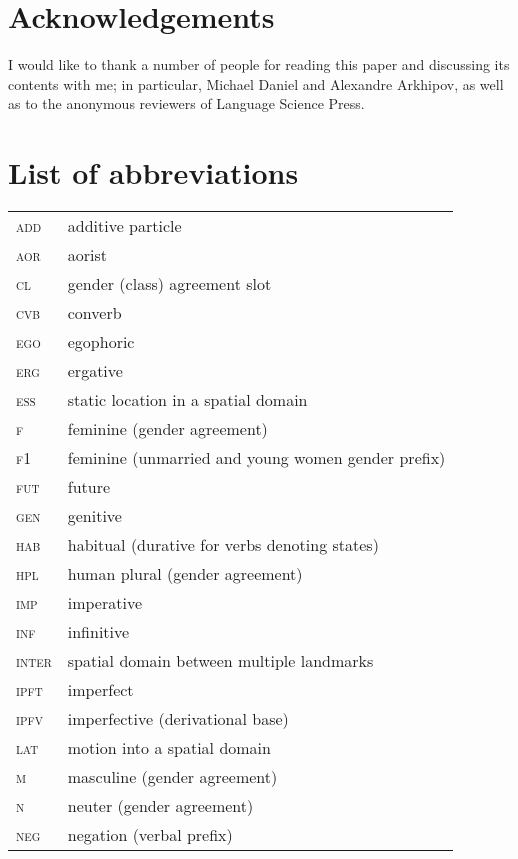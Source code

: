 \documentclass[output=paper]{langsci/langscibook}
\begin{document}
\section*{Acknowledgements}

I would like to thank a number of people for reading this paper and
discussing its contents with me; in particular, Michael Daniel and
Alexandre Arkhipov, as well as to the anonymous reviewers of Language
Science Press.



\section*{List of abbreviations}


\begin{longtable}[l]{@{}ll@{}}
\textsc{add}	& additive particle \\
\textsc{aor}	& aorist \\
\textsc{cl}	& gender (class) agreement slot \\
\textsc{cvb}	& converb \\
\textsc{ego}	& egophoric \\
\textsc{erg}	& ergative \\
\textsc{ess}	& static location in a spatial domain \\
\textsc{f}	& feminine (gender agreement) \\
\textsc{f1}	& feminine (unmarried and young women gender prefix) \\
\textsc{fut}	& future \\
\textsc{gen}	& genitive \\
\textsc{hab}	& habitual (durative for verbs denoting states) \\
\textsc{hpl}	& human plural (gender agreement) \\
\textsc{imp}	& imperative \\
\textsc{inf}	& infinitive \\
\textsc{inter}	& spatial domain between multiple landmarks \\
\textsc{ipft}	& imperfect \\
\textsc{ipfv}	& imperfective (derivational base) \\
\textsc{lat}	& motion into a spatial domain \\
\textsc{m}	& masculine (gender agreement) \\
\textsc{n}	& neuter (gender agreement) \\
\textsc{neg}	& negation (verbal prefix) \\

\end{longtable}
\end{document}
